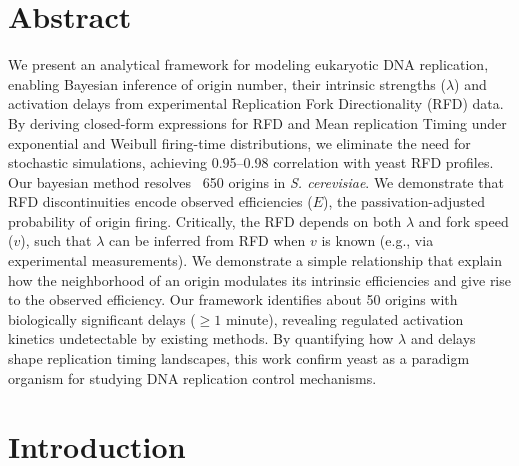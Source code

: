 \documentclass[10pt,a4paper]{revtex4-2}
\begin{document}
\section{Abstract}
We present an analytical framework for modeling eukaryotic DNA replication, enabling Bayesian inference of origin number, their intrinsic 
strengths (\(\lambda\)) and activation delays from experimental Replication Fork Directionality (RFD) data. 
By deriving closed-form expressions for RFD and Mean replication Timing under exponential and Weibull
 firing-time distributions, we eliminate the need for stochastic simulations, 
  achieving 0.95–0.98 correlation with yeast RFD profiles. 
  Our bayesian method resolves ~650 origins in \textit{S. cerevisiae}. 
  We demonstrate that RFD discontinuities encode observed efficiencies (\(E\)), 
  the passivation-adjusted probability of origin firing. Critically, 
  the RFD depends on both \(\lambda\) and fork speed (\(v\)), 
  such that \(\lambda\) can be inferred from RFD when \(v\) is known (e.g., via experimental measurements). 
  We demonstrate a simple relationship that explain how the neighborhood of an origin modulates its intrinsic efficiencies and
  give rise to the observed efficiency. 
  Our framework identifies about 50 origins with biologically significant delays (\(\geq 1\) minute), revealing regulated 
  activation kinetics undetectable by existing methods. By quantifying how \(\lambda\) and delays shape replication timing landscapes,
  this work confirm yeast as a paradigm organism for studying DNA replication control mechanisms.
%
%


\section{Introduction}
\end{document}
